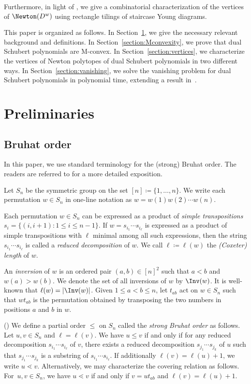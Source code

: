 Furthermore, in light of \cite[Corollary~8.2]{postnikovpermutohedra}, we give a combinatorial characterization of the vertices of $\Newton(D^w)$ using rectangle tilings of staircase Young diagrams.

This paper is organized as follows. In Section~\ref{section:preliminaries}, we give the necessary relevant background and definitions. In Section~\ref{section:Mconvexity}, we prove that dual Schubert polynomials are M-convex. In Section~\ref{section:vertices}, we characterize the vertices of Newton polytopes of dual Schubert polynomials in two different ways. In Section~\ref{section:vanishing}, we solve the vanishing problem for dual Schubert polynomials in polynomial time, extending a result in~\cite{ARY}.

\section{Preliminaries}\label{section:preliminaries}
\subsection{Bruhat order}
In this paper, we use standard terminology for the (strong) Bruhat order. The readers are referred to \cite[Chapter~2]{BjornerBrenti} for a more detailed exposition.

Let $S_n$ be the symmetric group on the set $[n] \coloneqq \{1, \dots, n\}$. 
We write each permutation $w\in S_n$ in one-line notation as $w = w(1)w(2)\cdots w(n)$. 

Each permutation $w \in S_n$ can be expressed as a product of \emph{simple transpositions} $s_i = \{(i, i+1) : 1\le i\le n-1\}$. If $w = s_{i_1}\cdots s_{i_{\ell}}$ is expressed as a product of simple transpositions with $\ell$ minimal among all such expressions, then the string $s_{i_1}\cdots s_{i_{\ell}}$ is called a \emph{reduced decomposition} of $w$. We call $\ell \coloneqq \ell(w)$ the \emph{(Coxeter) length} of $w$.

An \emph{inversion} of $w$ is an ordered pair $(a,b)\in [n]^2$ such that $a< b$ and $w(a)>w(b)$. We denote the set of all inversions of $w$ by $\Inv(w)$. It is well-known that $\ell(w) = |\Inv(w)|$. Given $1\le a < b\le n$, let $t_{ab}$ act on $w\in S_n$ such that $wt_{ab}$ is the permutation obtained by transposing the two numbers in positions $a$ and $b$ in $w$.

\begin{defi}(\cite{BjornerBrenti})\label{def:bruhatorder}
    We define a partial order $\le$ on $S_n$ called the \emph{strong Bruhat order} as follows. Let $u, v\in S_n$ and $\ell = \ell(v)$. 
    We have $u\le v$ if and only if for any reduced decomposition $s_{i_1}\cdots s_{i_{\ell}}$ of $v$, there exists a reduced decomposition $s_{j_1}\cdots s_{j_k}$ of $u$ such that $s_{j_1}\cdots s_{j_k}$ is a substring of $s_{i_1}\cdots s_{i_{\ell}}$. If additionally $\ell(v) = \ell(u) + 1$, we write $u\lessdot v$. Alternatively, we may characterize the covering relation as follows. For~$u, v \in S_n$, we have $u \lessdot v$ if and only if $v = ut_{ab}$ and $\ell(v) = \ell(u) + 1$.
\end{defi}

